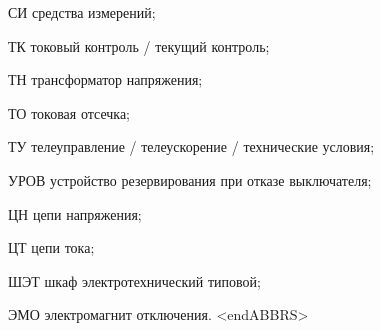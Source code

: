 \begin{list}{}
\item[СИ] средства измерений;
\item[ТК] токовый контроль / текущий контроль;
\item[ТН] трансформатор напряжения;
\item[ТО] токовая отсечка;
\item[ТУ] телеуправление / телеускорение / технические условия;
\item[УРОВ] устройство резервирования при отказе выключателя;
\item[ЦН] цепи напряжения;
\item[ЦТ] цепи тока;
\item[ШЭТ] шкаф электротехнический типовой;
\item[ЭМО] электромагнит отключения.
{\color{white}\fontsize{0.1pt}{0.1pt}\selectfont<endABBRS>}
\end{list}
